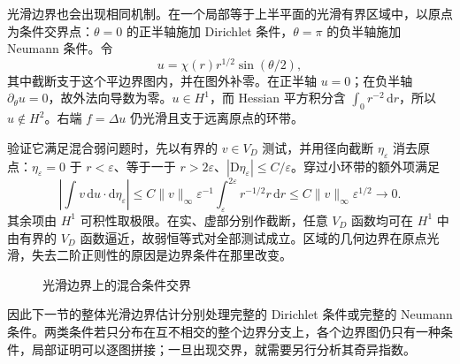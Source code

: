 \begin{example}\label{g3:exm:smooth-boundary-mixed-singularity}
	光滑边界也会出现相同机制。在一个局部等于上半平面的光滑有界区域中，以原点为条件交界点：\(\theta=0\) 的正半轴施加 Dirichlet 条件，\(\theta=\pi\) 的负半轴施加 Neumann 条件。令
	\[
		u=\chi(r)r^{1/2}\sin(\theta/2),
	\]
	其中截断支于这个平边界图内，并在图外补零。在正半轴 \(u=0\)；在负半轴 \(\partial_\theta u=0\)，故外法向导数为零。\(u\in H^1\)，而 Hessian 平方积分含 \(\int_0r^{-2}\,\mathrm dr\)，所以 \(u\notin H^2\)。右端 \(f=\Delta u\) 仍光滑且支于远离原点的环带。

	验证它满足混合弱问题时，先以有界的 \(v\in V_D\) 测试，并用径向截断 \(\eta_\varepsilon\) 消去原点：\(\eta_\varepsilon=0\) 于 \(r<\varepsilon\)、等于一于 \(r>2\varepsilon\)、\(|\mathrm D\eta_\varepsilon|\le C/\varepsilon\)。穿过小环带的额外项满足
	\[
		\left|\int v\,\mathrm du\cdot\mathrm d\eta_\varepsilon\right|
		\le C\|v\|_\infty\varepsilon^{-1}
		\int_\varepsilon^{2\varepsilon}r^{-1/2}r\,\mathrm dr
		\le C\|v\|_\infty\varepsilon^{1/2}\longrightarrow0.
	\]
	其余项由 \(H^1\) 可积性取极限。在实、虚部分别作截断，任意 \(V_D\) 函数均可在 \(H^1\) 中由有界的 \(V_D\) 函数逼近，故弱恒等式对全部测试成立。区域的几何边界在原点光滑，失去二阶正则性的原因是边界条件在那里改变。
\end{example}

\begin{figure}[htbp]
	\centering
	
	\caption{光滑边界上的混合条件交界}
	\label{g3:fig:mixed-boundary-interface}
\end{figure}

因此下一节的整体光滑边界估计分别处理完整的 Dirichlet 条件或完整的 Neumann 条件。两类条件若只分布在互不相交的整个边界分支上，各个边界图仍只有一种条件，局部证明可以逐图拼接；一旦出现交界，就需要另行分析其奇异指数。
